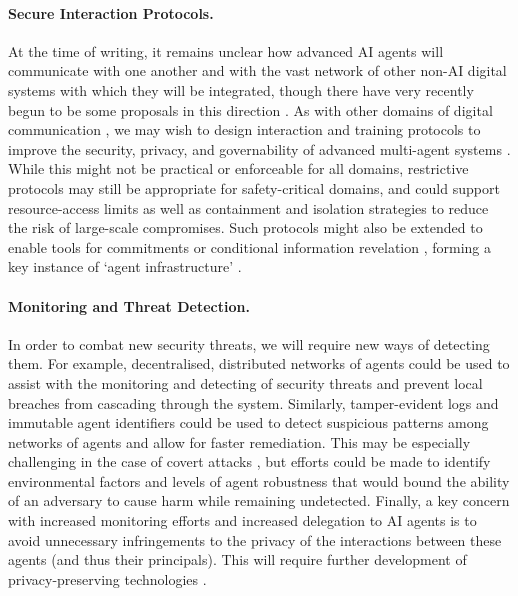 \paragraph{Secure Interaction Protocols.}
At the time of writing, it remains unclear how advanced AI agents will communicate with one another and with the vast network of other non-AI digital systems with which they will be integrated, though there have very recently begun to be some proposals in this direction \citep{Anthropic2024,Marro2024,gosmar2024aimultiagentinteroperabilityextension}.
As with other domains of digital communication \citep{poslad2002specifying}, we may wish to design {interaction and training protocols} to improve the security, privacy, and governability of advanced multi-agent systems \citep{Hammond2025}.
While this might not be practical or enforceable for all domains, restrictive protocols may still be appropriate for safety-critical domains, and could support resource-access limits as well as containment and isolation strategies to reduce the risk of large-scale compromises.
Such protocols might also be extended to enable tools for commitments \citep[e.g.,][see also ]{Sun2023} or conditional information revelation \citep[e.g.,][see ]{digiovanni2023commitment}, forming a key instance of `agent infrastructure' \citep{Chan2025}.


\paragraph{Monitoring and Threat Detection.}
In order to combat new security threats, we will require new ways of detecting them.
For example, decentralised, distributed networks of agents could be used to assist with the {monitoring and detecting of security threats} \citep{Hasan_2024} and prevent local breaches from cascading through the system.
Similarly, tamper-evident logs \citep{Sutton2018a} and immutable agent identifiers \citep{Chan2024} could be used to detect suspicious patterns among networks of agents \citep{Ju2024} and allow for faster remediation.
This may be especially challenging in the case of covert attacks \citep{franzmeyer_illusory_2023,halawi2024covert,wei2023jailbroken}, but efforts could be made to identify environmental factors and levels of agent robustness that would bound the ability of an adversary to cause harm while remaining undetected.
Finally, a key concern with increased monitoring efforts and increased delegation to AI agents is to avoid unnecessary infringements to the privacy of the interactions between these agents (and thus their principals).
This will require further development of privacy-preserving technologies \citep{stadler_why_2022,vegesna2023privacy}.

